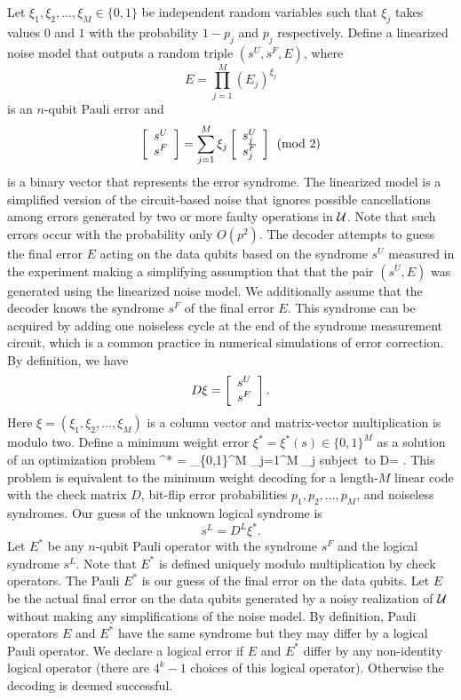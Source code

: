 \documentclass{article}
\begin{document}
Let $\xi_1,\xi_2,\ldots,\xi_M \in \{0,1\}$ be independent random variables such that
$\xi_j$ takes values $0$ and $1$ with the probability $1-p_j$ and $p_j$
respectively.
Define a linearized noise model  that outputs a random triple $(s^U,s^F,E)$,
where
\[
E=\prod_{j=1}^M (E_j)^{\xi_j}
\]
 is an $n$-qubit Pauli error
and
\[
 \left[
\ba{c}
s^U  \\ 
s^F \\
\ea
\right]= 
\sum_{j=1}^M \xi_j  \left[
\ba{c}
s^U_j  \\ 
s^F_j \\
\ea
\right] {\pmod 2}
\]
is a binary vector that represents the error syndrome.
The linearized model is a simplified version of the circuit-based noise that
ignores possible cancellations among errors generated by two or more faulty
operations in $\calU$. Note that such errors occur with the probability only $O(p^2)$.
The decoder attempts to guess the final error $E$
acting on the data qubits
based on the syndrome $s^U$ measured in the experiment  making a simplifying assumption
that that the  pair $(s^U,E)$ was generated using the linearized noise model.
We additionally assume that the decoder
knows the syndrome $s^F$ of the final error $E$.
This syndrome can be acquired  by adding one noiseless  cycle
at the end of the syndrome measurement circuit,
which is a common practice in numerical simulations of error correction.
By definition, we have
\[
D\xi= \left[
\ba{c}
s^U  \\ 
s^F \\
\ea
\right].
\]
Here $\xi=(\xi_1,\xi_2,\ldots,\xi_M)$ is  a column vector and matrix-vector multiplication is modulo two. 
Define a minimum weight error $\xi^*=\xi^*(s)\in \{0,1\}^M$ as 
a solution of an optimization problem
\be
\label{MWD}
\xi^* = \arg \min_{\xi \in \{0,1\}^M} \; \sum_{j=1}^M  \xi_j \quad
\mbox{subject to} \quad 
D\xi = \left[
\ba{c}
s^U  \\ 
s^F \\
\ea
\right].
\ee
This problem is equivalent to the minimum weight decoding for a length-$M$ linear code with the check matrix $D$,
 bit-flip error probabilities $p_1,p_2,\ldots,p_M$,
and noiseless syndromes. 
Our guess of the unknown logical syndrome is 
\[
s^L = D^L \xi^*.
\]
Let $E^*$ be any $n$-qubit Pauli operator
with the syndrome $s^F$ and the logical syndrome $s^L$.
Note that $E^*$ is defined uniquely modulo multiplication by check operators.
The Pauli $E^*$ is our guess of the  final error on the data qubits.
Let $E$ be the actual final error on the data qubits generated by a noisy realization of $\calU$
without making any simplifications of the noise model.
By definition, Pauli operators  $E$ and $E^*$ have the same syndrome but they may differ
by a logical Pauli operator.
We declare a logical error if $E$ and $E^*$ differ by any non-identity logical operator
(there are $4^k-1$ choices of this logical operator).
Otherwise the decoding is  deemed successful. 
\end{document}
